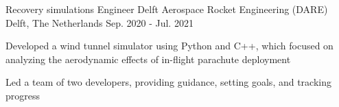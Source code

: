   \cventry
    {Recovery simulations Engineer } %
    {Delft Aerospace Rocket Engineering (DARE) } %
    {Delft, The Netherlands} %
    {Sep. 2020 - Jul. 2021} %
    {
      \begin{cvitems} %
        \item {Developed a wind tunnel simulator using Python and C++, which focused on analyzing the aerodynamic effects of in-flight parachute deployment}
        \item {Led a team of two developers, providing guidance, setting goals, and tracking progress}
      \end{cvitems}
    }
